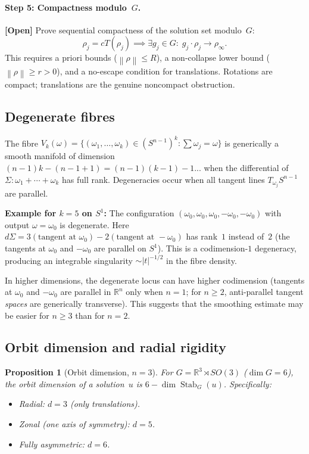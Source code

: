 \documentclass[12pt]{article}
\newtheorem{proposition}[theorem]{Proposition}
\theoremstyle{definition}
\theoremstyle{remark}
\DeclareMathOperator{\Stab}{Stab}
\newcommand{\R}{\mathbb{R}}
\newcommand{\norm}[1]{\left\|#1\right\|}
\newcommand{\open}{\textbf{\color{red}[Open]}}
\begin{document}
\paragraph{Step 5: Compactness modulo~$G$.}  \open\quad
Prove sequential compactness of the solution set modulo~$G$:
\[
  \rho_j=cT(\rho_j)\implies\exists g_j\in G:\;g_j\cdot\rho_j\to\rho_\infty.
\]
This requires a priori bounds ($\norm\rho\leq R$), a non-collapse lower
bound ($\norm\rho\geq r>0$), and a no-escape condition for translations.
Rotations are compact; translations are the genuine noncompact obstruction.

\subsection{Degenerate fibres}
\label{sec:degenerate-fibres}

The fibre $V_k(\omega)=\{(\omega_1,\ldots,\omega_k)\in(S^{n-1})^k:
\sum\omega_j=\omega\}$ is generically a smooth manifold of dimension
$(n-1)k-(n-1+1)=(n-1)(k-1)-1$... when the differential of
$\Sigma:\omega_1+\cdots+\omega_k$ has full rank.  Degeneracies occur when
all tangent lines $T_{\omega_j}S^{n-1}$ are parallel.

\textbf{Example for $k=5$ on $S^1$:}  The configuration
$(\omega_0,\omega_0,\omega_0,-\omega_0,-\omega_0)$ with output
$\omega=\omega_0$ is degenerate.  Here
$d\Sigma=3(\text{tangent at }\omega_0)-2(\text{tangent at }-\omega_0)$
has rank~$1$ instead of~$2$ (the tangents at $\omega_0$ and $-\omega_0$
are parallel on $S^1$).  This is a codimension-$1$ degeneracy, producing
an integrable singularity $\sim|t|^{-1/2}$ in the fibre density.

In higher dimensions, the degenerate locus can have higher codimension
(tangents at $\omega_0$ and $-\omega_0$ are parallel in $\R^n$ only
when $n=1$; for $n\geq 2$, anti-parallel tangent \emph{spaces} are
generically transverse).  This suggests that the smoothing estimate may
be easier for $n\geq 3$ than for $n=2$.

\subsection{Orbit dimension and radial rigidity}

\begin{proposition}[Orbit dimension, $n=3$]
  For $G=\R^3\rtimes SO(3)$ ($\dim G=6$), the orbit dimension of a
  solution~$u$ is $6-\dim\Stab_G(u)$.  Specifically:
  \begin{itemize}
    \item Radial: $d=3$ (only translations).
    \item Zonal (one axis of symmetry): $d=5$.
    \item Fully asymmetric: $d=6$.
  \end{itemize}
\end{proposition}
\end{document}
